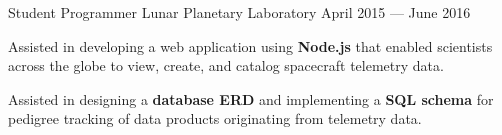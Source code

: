 \begin{cventries}
  \cventry
    {Student Programmer} %
    {Lunar Planetary Laboratory} %
    {April 2015 --- June 2016} %
    {} %
    {
      \vspace{-0.1cm}
      \begin{cvitems} %
        \item Assisted in developing a web application using \textbf{Node.js} that enabled scientists across the globe to view, create, and catalog spacecraft telemetry data.
        \item Assisted in designing a \textbf{database ERD} and implementing a \textbf{SQL schema} for pedigree tracking of data products originating from telemetry data.
      \end{cvitems}
    }

\end{cventries}
